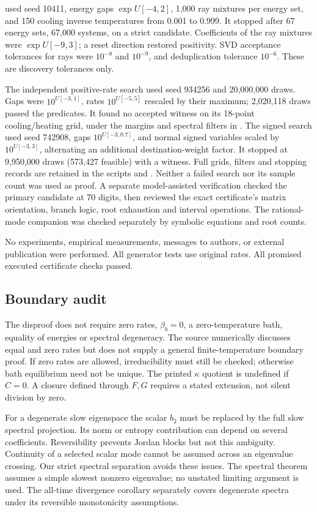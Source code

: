 \documentclass[11pt]{article}
\begin{document}
 used seed 10411, energy gaps $\exp U[-4,2]$, 1,000 ray mixtures per energy set, and 150 cooling inverse temperatures from 0.001 to 0.999. It stopped after 67 energy sets, 67,000 systems, on a strict candidate. Coefficients of the ray mixtures were $\exp U[-9,3]$; a reset direction restored positivity. SVD acceptance tolerances for rays were $10^{-8}$ and $10^{-9}$, and deduplication tolerance $10^{-6}$. These are discovery tolerances only.

The independent positive-rate search used seed 934256 and 20,000,000 draws. Gaps were $10^{U[-3,1]}$, rates $10^{U[-5,5]}$ rescaled by their maximum; 2,020,118 draws passed the predicates. It found no accepted witness on its 18-point cooling/heating grid, under the margins and spectral filters in . The signed search used seed 742908, gaps $10^{U[-3,0.7]}$, and normal signed variables scaled by $10^{U[-3,3]}$, alternating an additional destination-weight factor. It stopped at 9,950,000 draws (573,427 feasible) with a witness. Full grids, filters and stopping records are retained in the scripts and . Neither a failed search nor its sample count was used as proof. A separate model-assisted verification checked the primary candidate at 70 digits, then reviewed the exact certificate's matrix orientation, branch logic, root exhaustion and interval operations. The rational-mode companion was checked separately by symbolic equations and root counts.

No experiments, empirical measurements, messages to authors, or external publication were performed. All generator tests use original rates. All promised executed certificate checks passed.

\subsection{Boundary audit}
The disproof does not require zero rates, $\beta_b=0$, a zero-temperature bath, equality of energies or spectral degeneracy. The source numerically discusses equal and zero rates but does not supply a general finite-temperature boundary proof. If zero rates are allowed, irreducibility must still be checked; otherwise bath equilibrium need not be unique. The printed $\kappa$ quotient is undefined if $C=0$. A closure defined through $F,G$ requires a stated extension, not silent division by zero.

For a degenerate slow eigenspace the scalar $b_2$ must be replaced by the full slow spectral projection. Its norm or entropy contribution can depend on several coefficients. Reversibility prevents Jordan blocks but not this ambiguity. Continuity of a selected scalar mode cannot be assumed across an eigenvalue crossing. Our strict spectral separation avoids these issues. The spectral theorem assumes a simple slowest nonzero eigenvalue; no unstated limiting argument is used. The all-time divergence corollary separately covers degenerate spectra under its reversible monotonicity assumptions.
\end{document}
